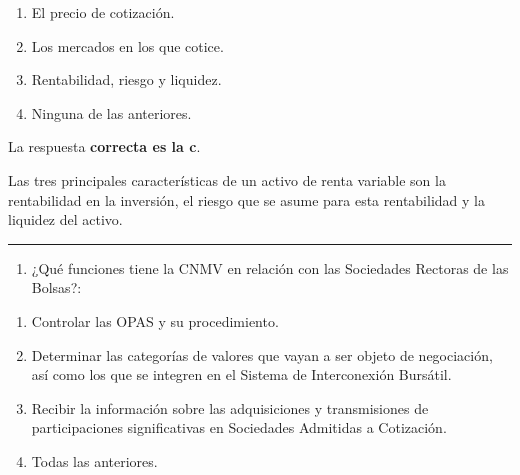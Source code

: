 \documentclass[
  letterpaper,
  DIV=11,
  numbers=noendperiod]{scrreprt}
\providecommand{\tightlist}{%
  \setlength{\itemsep}{0pt}\setlength{\parskip}{0pt}}\usepackage{longtable,booktabs,array}
\begin{document}
\begin{enumerate}
\def\labelenumi{\alph{enumi})}
\item
  El precio de cotización.
\item
  Los mercados en los que cotice.
\item
  Rentabilidad, riesgo y liquidez.
\item
  Ninguna de las anteriores.
\end{enumerate}

\begin{tcolorbox}[enhanced jigsaw, left=2mm, opacityback=0, colback=white, breakable, arc=.35mm, bottomrule=.15mm, rightrule=.15mm, toprule=.15mm, leftrule=.75mm, colframe=quarto-callout-tip-color-frame]
\begin{minipage}[t]{5.5mm}
\textcolor{quarto-callout-tip-color}{\faLightbulb}
\end{minipage}%
\begin{minipage}[t]{\textwidth - 5.5mm}

La respuesta \textbf{correcta es la c}.

Las tres principales características de un activo de renta variable son
la rentabilidad en la inversión, el riesgo que se asume para esta
rentabilidad y la liquidez del activo.

\end{minipage}%
\end{tcolorbox}

\begin{center}\rule{0.5\linewidth}{0.5pt}\end{center}

\begin{enumerate}
\def\labelenumi{\arabic{enumi}.}
\setcounter{enumi}{36}
\tightlist
\item
  ¿Qué funciones tiene la CNMV en relación con las Sociedades Rectoras
  de las Bolsas?:
\end{enumerate}

\begin{enumerate}
\def\labelenumi{\alph{enumi})}
\item
  Controlar las OPAS y su procedimiento.
\item
  Determinar las categorías de valores que vayan a ser objeto de
  negociación, así como los que se integren en el Sistema de
  Interconexión Bursátil.
\item
  Recibir la información sobre las adquisiciones y transmisiones de
  participaciones significativas en Sociedades Admitidas a Cotización.
\item
  Todas las anteriores.
\end{enumerate}
\end{document}
